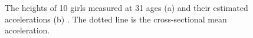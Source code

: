\begin{figure}
    \centering
    \qquad
    \caption[Functional data]{The heights of 10 girls measured at 31 ages (a) and their estimated accelerations (b) \cite{ramsay_functional_2006}. The dotted line is the cross-sectional mean acceleration.}
    \label{fig:crescitaacc}
\end{figure}
